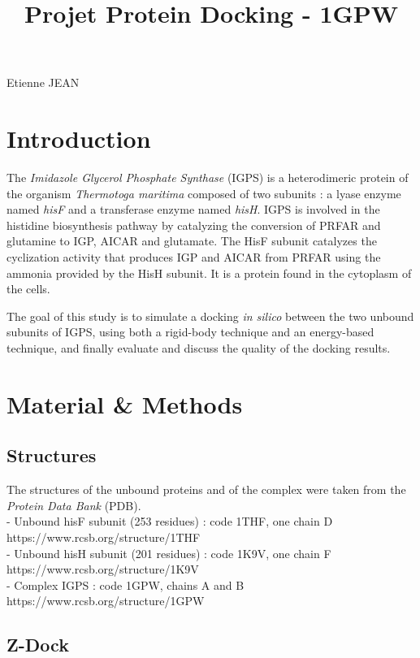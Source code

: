 \documentclass[11pt]{article}
\title{Projet Protein Docking  - 1GPW}
\begin{document}
    
    
    \maketitle
    
    

    
    Etienne JEAN

    \section{Introduction}\label{introduction}

The \emph{Imidazole Glycerol Phosphate Synthase} (IGPS) is a
heterodimeric protein of the organism \emph{Thermotoga maritima}
composed of two subunits : a lyase enzyme named \emph{hisF} and a
transferase enzyme named \emph{hisH}. IGPS is involved in the histidine
biosynthesis pathway by catalyzing the conversion of PRFAR and glutamine
to IGP, AICAR and glutamate. The HisF subunit catalyzes the cyclization
activity that produces IGP and AICAR from PRFAR using the ammonia
provided by the HisH subunit. It is a protein found in the cytoplasm of
the cells.

The goal of this study is to simulate a docking \emph{in silico} between
the two unbound subunits of IGPS, using both a rigid-body technique and
an energy-based technique, and finally evaluate and discuss the quality
of the docking results.

    \section{Material \& Methods}\label{material-methods}

\subsection{Structures}\label{structures}

The structures of the unbound proteins and of the complex were taken
from the \emph{Protein Data Bank} (PDB).\\
- Unbound hisF subunit (253 residues) : code 1THF, one chain D
https://www.rcsb.org/structure/1THF\\
- Unbound hisH subunit (201 residues) : code 1K9V, one chain F
https://www.rcsb.org/structure/1K9V\\
- Complex IGPS : code 1GPW, chains A and B
https://www.rcsb.org/structure/1GPW

\subsection{Z-Dock}\label{z-dock}
\end{document}
